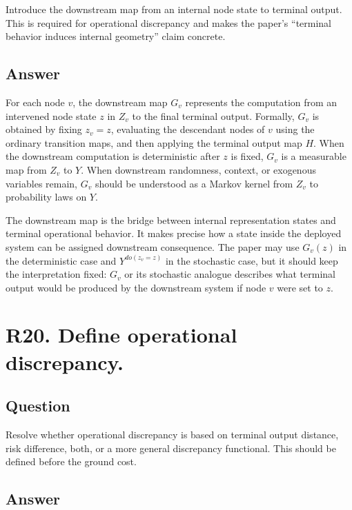 \documentclass[11pt,a4paper]{article}
\begin{document}
Introduce the downstream map from an internal node state to terminal output. This is required for operational discrepancy and makes the paper's ``terminal behavior induces internal geometry'' claim concrete.

\subsection*{Answer}

For each node \(v\), the downstream map \(G_v\) represents the computation from an intervened node state \(z\) in \(Z_v\) to the final terminal output. Formally, \(G_v\) is obtained by fixing \(z_v = z\), evaluating the descendant nodes of \(v\) using the ordinary transition maps, and then applying the terminal output map \(H\). When the downstream computation is deterministic after \(z\) is fixed, \(G_v\) is a measurable map from \(Z_v\) to \(Y\). When downstream randomness, context, or exogenous variables remain, \(G_v\) should be understood as a Markov kernel from \(Z_v\) to probability laws on \(Y\).

The downstream map is the bridge between internal representation states and terminal operational behavior. It makes precise how a state inside the deployed system can be assigned downstream consequence. The paper may use \(G_v(z)\) in the deterministic case and \(Y^{do(z_v=z)}\) in the stochastic case, but it should keep the interpretation fixed: \(G_v\) or its stochastic analogue describes what terminal output would be produced by the downstream system if node \(v\) were set to \(z\).

\section*{R20. Define operational discrepancy.}

\subsection*{Question}

Resolve whether operational discrepancy is based on terminal output distance, risk difference, both, or a more general discrepancy functional. This should be defined before the ground cost.

\subsection*{Answer}
\end{document}

